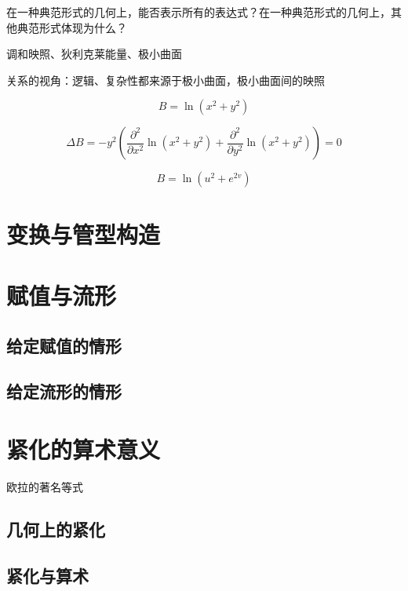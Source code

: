 \documentclass[a4paper,12pt]{article}
\numberwithin{definition}{section}
\numberwithin{lemma}{section}
\numberwithin{proposition}{section}
\numberwithin{theorem}{section}
\numberwithin{grammar}{section}
\numberwithin{program}{section}
\numberwithin{convention}{section}
\numberwithin{corollary}{section}
\begin{document}
在一种典范形式的几何上，能否表示所有的表达式？在一种典范形式的几何上，其他典范形式体现为什么？

调和映照、狄利克莱能量、极小曲面

关系的视角：逻辑、复杂性都来源于极小曲面，极小曲面间的映照

\begin{equation}
   B  = \ln (x^2+ y^2)
\end{equation}

\begin{equation}
\Delta B = - y^2 (\frac{\partial^2}{\partial x^2} \ln (x^2+ y^2) + \frac{\partial^2}{\partial y^2} \ln (x^2+ y^2)) = 0
\end{equation}


\begin{equation}
   B  = \ln (u^2+ e^{2v})
\end{equation}

\newpage

\section{变换与管型构造}
\newpage

\section{赋值与流形}

\subsection{给定赋值的情形}

\subsection{给定流形的情形}

\newpage

\section{紧化的算术意义}

欧拉的著名等式

\subsection{几何上的紧化}

\subsection{紧化与算术}
\end{document}
